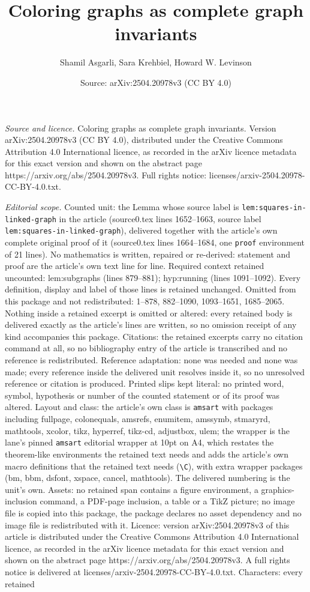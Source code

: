 \documentclass[10pt,a4paper]{amsart}
\title[Coloring graphs as complete graph invariants]{Coloring graphs as complete graph invariants}
\author{Shamil Asgarli, Sara Krehbiel, Howard W. Levinson}
\date{Source: arXiv:2504.20978v3 (CC BY 4.0)}
\begin{document}
\maketitle

\noindent\emph{Source and licence.} Coloring graphs as complete graph invariants. Version arXiv:2504.20978v3 (CC BY 4.0), distributed under the Creative Commons Attribution 4.0 International licence, as recorded in the arXiv licence metadata for this exact version and shown on the abstract page https://arxiv.org/abs/2504.20978v3. Full rights notice: licenses/arxiv-2504.20978-CC-BY-4.0.txt.\par\smallskip

\noindent\textit{Editorial scope.} Counted unit: the Lemma whose source label is \texttt{lem:squares-in-linked-graph} in the article (source0.tex lines 1652--1663, source label \texttt{lem:squares-in-linked-graph}), delivered together with the article's own complete original proof of it (source0.tex lines 1664--1684, one \texttt{proof} environment of 21 lines). No mathematics is written, repaired or re-derived: statement and proof are the article's own text line for line. Required context retained uncounted: lem:subgraphs (lines 879--881); hyp:running (lines 1091--1092). Every definition, display and label of those lines is retained unchanged. Omitted from this package and not redistributed: 1--878, 882--1090, 1093--1651, 1685--2065. Nothing inside a retained excerpt is omitted or altered: every retained body is delivered exactly as the article's lines are written, so no omission receipt of any kind accompanies this package. Citations: the retained excerpts carry no citation command at all, so no bibliography entry of the article is transcribed and no reference is redistributed. Reference adaptation: none was needed and none was made; every reference inside the delivered unit resolves inside it, so no unresolved reference or citation is produced. Printed slips kept literal: no printed word, symbol, hypothesis or number of the counted statement or of its proof was altered. Layout and class: the article's own class is \texttt{amsart} with packages including fullpage, colonequals, amsrefs, enumitem, amssymb, stmaryrd, mathtools, xcolor, tikz, hyperref, tikz-cd, adjustbox, ulem; the wrapper is the lane's pinned \texttt{amsart} editorial wrapper at 10pt on A4, which restates the theorem-like environments the retained text needs and adds the article's own macro definitions that the retained text needs (\texttt{\textbackslash C}), with extra wrapper packages (bm, bbm, dsfont, xspace, cancel, mathtools). The delivered numbering is the unit's own. Assets: no retained span contains a figure environment, a graphics-inclusion command, a PDF-page inclusion, a table or a TikZ picture; no image file is copied into this package, the package declares no asset dependency and no image file is redistributed with it. Licence: version arXiv:2504.20978v3 of this article is distributed under the Creative Commons Attribution 4.0 International licence, as recorded in the arXiv licence metadata for this exact version and shown on the abstract page https://arxiv.org/abs/2504.20978v3. A full rights notice is delivered at licenses/arxiv-2504.20978-CC-BY-4.0.txt. Characters: every retained 
\end{document}
